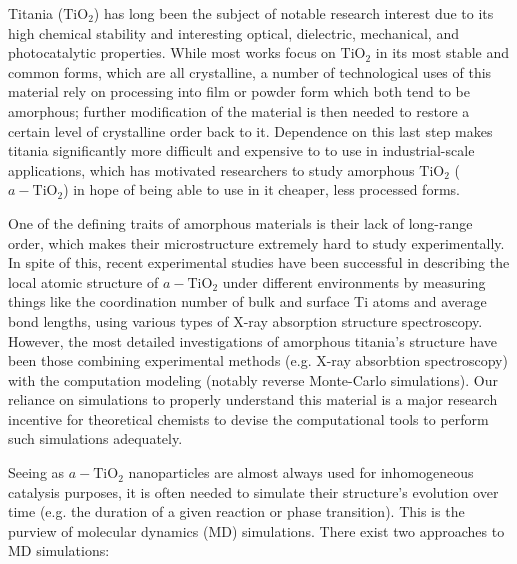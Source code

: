 \documentclass[aps,prb,twocolumn,amsmath,amssymb,superscriptaddress,longbibliography]{revtex4-1}
\newcommand\tab[1][1cm]{\hspace*{#1}} %
\begin{document}
\tab Titania ($\text{TiO}_2$) has long been the subject of notable research interest due to its high chemical stability and interesting optical, dielectric, mechanical, and photocatalytic properties\cite{optical,thin-film,mechanical,photocatalytic}. 
While most works focus on $\text{TiO}_2$ in its most stable and common forms, which are all crystalline, a number of technological uses of this material rely on processing into film or powder form which both tend to be amorphous; further modification of the material is then needed to restore a certain level of crystalline order back to it\cite{a2c,ab_initio}.
Dependence on this last step makes titania significantly more difficult and expensive to to use in industrial-scale applications, which has motivated researchers to study amorphous $\text{TiO}_2$ ($a-\text{TiO}_2$) in hope of being able to use in it cheaper, less processed forms\cite{useful1,useful2,useful3}. 

\tab One of the defining traits of amorphous materials is their lack of long-range order, which makes their microstructure extremely hard to study experimentally.
In spite of this, recent experimental studies have been successful in describing the local atomic structure of $a-\text{TiO}_2$ under different environments\cite{exptl1,exptl2,exptl3} by measuring things like the coordination number of bulk and surface Ti atoms and average bond lengths, using various types of X-ray absorption structure spectroscopy.
However, the most detailed investigations of amorphous titania's structure have been those combining experimental methods (e.g. X-ray absorbtion spectroscopy) with the computation modeling (notably reverse Monte-Carlo simulations)\cite{comp_exptl1,comp_exptl2,comp_exptl3}.
Our reliance on simulations to properly understand this material is a major research incentive for theoretical chemists to devise the computational tools to perform such simulations adequately.

\tab Seeing as $a-\text{TiO}_2$ nanoparticles are almost always used for inhomogeneous catalysis purposes, it is often needed to simulate their structure's evolution over time (e.g. the duration of a given reaction or phase transition).
This is the purview of molecular dynamics (MD) simulations.
There exist two approaches to MD simulations:
\end{document}

